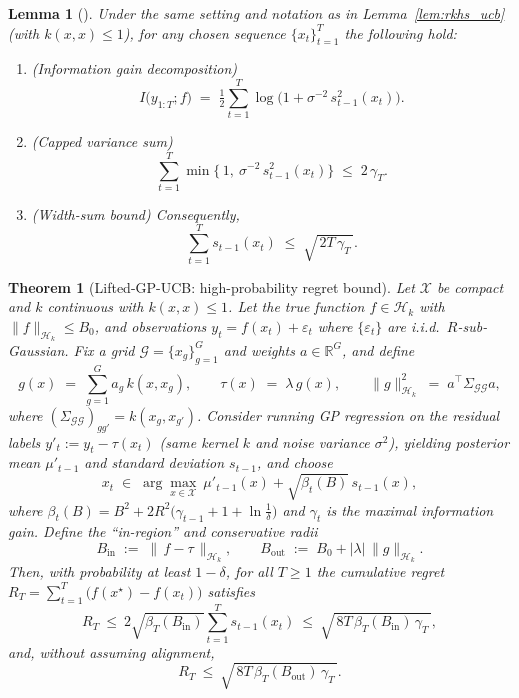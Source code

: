 \documentclass{article} %
\newtheorem{lemma}{Lemma}
\newtheorem{theorem}{Theorem}
\begin{document}
\begin{lemma}[{\cite[Lemma~5.3 \& Lemma~5.4]{srinivas2009gaussian}}]\label{lem:width_sum}
Under the same setting and notation as in Lemma~\ref{lem:rkhs_ucb} (with $k(x,x)\le 1$), for any chosen sequence $\{x_t\}_{t=1}^T$ the following hold:
\begin{enumerate}
\item (\emph{Information gain decomposition}) 
\[
I\big(y_{1:T}; f\big)
\;=\;
\tfrac12\sum_{t=1}^T \log\!\Big(1+\sigma^{-2}\,s_{t-1}^2(x_t)\Big).
\]
\item (\emph{Capped variance sum}) 
\[
\sum_{t=1}^T \min\!\Big\{\,1,\ \sigma^{-2}\,s_{t-1}^2(x_t)\Big\}
\;\le\; 2\,\gamma_T.
\]
\item (\emph{Width-sum bound}) Consequently,
\begin{equation}\label{equ:lem2}
    \sum_{t=1}^T s_{t-1}(x_t)
\;\le\; \sqrt{\,2T\,\gamma_T\,}.
\end{equation}
\end{enumerate}
\end{lemma}
\begin{theorem}[Lifted-GP-UCB: high-probability regret bound]\label{thm:tilted_ucb}
Let $\mathcal X$ be compact and $k$ continuous with $k(x,x)\le 1$. 
Let the true function $f\in\mathcal H_k$ with $\|f\|_{\mathcal H_k}\le B_0$, and observations $y_t=f(x_t)+\varepsilon_t$ where $\{\varepsilon_t\}$ are i.i.d.\ $R$-sub-Gaussian.
Fix a grid $\mathcal G=\{x_g\}_{g=1}^G$ and weights $a\in\mathbb R^G$, and define
\[
g(x)\;=\;\sum_{g=1}^G a_g\,k(x,x_g),\qquad 
\tau(x)\;=\;\lambda\,g(x),\qquad 
\|g\|_{\mathcal H_k}^2 \;=\; a^\top \Sigma_{\mathcal G\mathcal G} a,
\]
where $(\Sigma_{\mathcal G\mathcal G})_{gg'}=k(x_g,x_{g'})$.
Consider running GP regression on the \emph{residual} labels $y'_t:=y_t-\tau(x_t)$ (same kernel $k$ and noise variance $\sigma^2$), yielding posterior mean $\mu'_{t-1}$ and standard deviation $s_{t-1}$, and choose
\[
x_t \;\in\; \arg\max_{x\in\mathcal X}\ \mu'_{t-1}(x) + \sqrt{\beta_t(B)}\, s_{t-1}(x),
\]
where $\beta_t(B)=B^2+2R^2\big(\gamma_{t-1}+1+\ln\tfrac1\delta\big)$ and $\gamma_{t}$ is the maximal information gain.
Define the ``in-region'' and conservative radii
\[
B_{\mathrm{in}}\;:=\;\|\,f-\tau\,\|_{\mathcal H_k},
\qquad
B_{\mathrm{out}}\;:=\;B_0+|\lambda|\,\|g\|_{\mathcal H_k}.
\]
Then, with probability at least $1-\delta$, for all $T\ge 1$ the cumulative regret $R_T=\sum_{t=1}^T\big(f(x^\star)-f(x_t)\big)$ satisfies
\[
R_T \ \le\ 2\sqrt{\beta_T(B_{\mathrm{in}})}\sum_{t=1}^T s_{t-1}(x_t)
\ \le\ \sqrt{\,8T\,\beta_T(B_{\mathrm{in}})\,\gamma_T\,},
\]
and, without assuming alignment,
\[
R_T \ \le\ \sqrt{\,8T\,\beta_T(B_{\mathrm{out}})\,\gamma_T\,}.
\]
\end{theorem}
\end{document}
